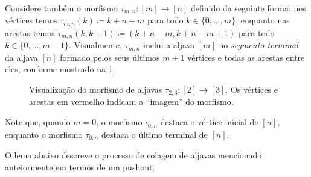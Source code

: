 Considere também o morfismo $\tau_{m,n}: [m] \to [n]$ definido da seguinte forma: nos vértices temos $\tau_{m,n}(k) \coloneqq k+n-m$ para todo $k \in \{0,\dots,m\}$, enquanto nas arestas temos $\tau_{m,n}(k,k+1) \coloneqq (k+n-m,k+n-m+1)$ para todo $k \in \{0,\dots,m-1\}$.
Visualmente, $\tau_{m,n}$ inclui a aljava $[m]$ no \emph{segmento terminal} da aljava $[n]$ formado pelos seus últimos $m+1$ vértices e todas as arestas entre eles, conforme mostrado na \cref{fig:morfismo_aljavas_segmento_terminal}.

\begin{figure}[h]
    \centering
    \caption{Visualização do morfismo de aljavas $\tau_{2,3}: [2] \to [3]$. Os vértices e arestas em vermelho indicam a ``imagem'' do morfismo.}
    \label{fig:morfismo_aljavas_segmento_terminal}
\end{figure}

Note que, quando $m=0$, o morfismo $\iota_{0,n}$ destaca o vértice inicial de $[n]$, enquanto o morfismo $\tau_{0,n}$ destaca o último terminal de $[n]$.

O lema abaixo descreve o processo de colagem de aljavas mencionado anteiormente em termos de um pushout.

